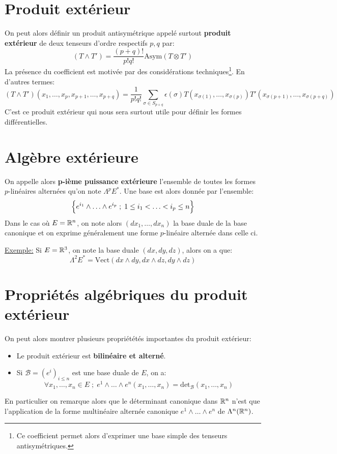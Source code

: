    \section{Produit extérieur}
   On peut alors définir un produit antisymétrique appelé surtout \textbf{produit extérieur} de deux tenseurs d'ordre respectifs \( p, q \) par:
   \[
      (T \wedge T') = \frac{(p+q)!}{p!q!}\text{Asym}(T \otimes T')
   \]
   La présence du coefficient est motivée par des considérations techniques\footnote[1]{Ce coefficient permet alors d'exprimer une base simple des tenseurs antisymétriques.}. En d'autres termes:
   \[
      (T \wedge T')(x_1, \ldots, x_p, x_{p+1}, \ldots, x_{p+q}) =  \frac{1}{p!q!}\sum_{\sigma \in S_{p+q}}\epsilon(\sigma) T(x_{\sigma(1)}, \ldots, x_{\sigma(p)})T'(x_{\sigma(p+1)}, \ldots, x_{\sigma(p+q)})
   \]
   C'est ce produit extérieur qui nous sera surtout utile pour définir les formes différentielles.
   \section{Algèbre extérieure}
   On appelle alors \textbf{p-ième puissance extérieure} l'ensemble de toutes les formes \(p\)-linéaires alternées qu'on note \(\Lambda^p E^*\). Une base est alors donnée par l'ensemble:
   \[
      \Bigl\{ e^{i_1} \wedge \ldots \wedge e^{i_p} \; ; \; 1 \leq i_1 < \ldots < i_p \leq n  \Bigl\}
   \]
   Dans le cas où \( E = \mathbb{R}^n \), on note alors \( (dx_1, \ldots, dx_n) \) la base duale de la base canonique et on exprime généralement une forme \( p \)-linéaire alternée dans celle ci.\<

   \uline{Exemple:} Si \( E = \mathbb{R}^3 \), on note la base duale \((dx, dy, dz)\), alors on a que:
   \[
      \Lambda^2E^* = \text{Vect}(dx \wedge dy, dx \wedge dz, dy \wedge dz)
   \]
   \pagebreak
   \section{Propriétés algébriques du produit extérieur}
   On peut alors montrer plusieurs propriététés importantes du produit extérieur:
   \begin{itemize}
      \item Le produit extérieur est \textbf{bilinéaire et alterné}.
      \item Si \( \mathcal{B} = (e^i)_{i \leq n} \) est une base duale de \( E \), on a:
      \[ 
         \forall x_1, \ldots, x_n \in E \; ; \; e^1 \wedge \ldots \wedge e^n(x_1, \ldots, x_n) = \text{det}_{\mathcal{B}}(x_1, \ldots, x_n)
      \]
   \end{itemize}
   En particulier on remarque alors que le déterminant canonique dans \( \mathbb{R}^n \) n'est que l'application de la forme multinéaire alternée canonique \( e^1 \wedge \ldots \wedge e^n \) de \( \Lambda^n(\mathbb{R}^n) \).
